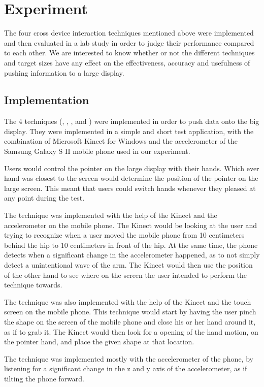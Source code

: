 \section{Experiment} \label{sec:experiment}
The four cross device interaction techniques mentioned above were implemented and then evaluated in a lab study in order to judge their performance compared to each other. 
We are interested to know whether or not the different techniques and target sizes have any effect on the effectiveness, accuracy and usefulness of pushing information to a large display. 

\subsection{Implementation}

The 4 techniques (\swipe, \tilt, \throw, and \pinch) were implemented in order to push data onto the big display. They were implemented in a simple and short test application, with the combination of Microsoft Kinect for Windows and the accelerometer of the Samsung Galaxy S II mobile phone used in our experiment. 

Users would control the pointer on the large display with their hands. 
Which ever hand was closest to the screen would determine the position of the pointer on the large screen. 
This meant that users could switch hands whenever they pleased at any point during the test. 

The \throw technique was implemented with the help of the Kinect and the accelerometer on the mobile phone. 
The Kinect would be looking at the user and trying to recognize when a user moved the mobile phone from 10 centimeters behind the hip to 10 centimeters in front of the hip. 
At the same time, the phone detects when a significant change in the accelerometer happened, as to not simply detect a unintentional wave of the arm. 
The Kinect would then use the position of the other hand to see where on the screen the user intended to perform the \throw technique towards. 

The \pinch technique was also implemented with the help of the Kinect and the touch screen on the mobile phone. 
This technique would start by having the user pinch the shape on the screen of the mobile phone and close his or her hand around it, as if to grab it. 
The Kinect would then look for a opening of the hand motion, on the pointer hand, and place the given shape at that location. 

The \tilt technique was implemented mostly with the accelerometer of the phone, by listening for a significant change in the z and y axis of the accelerometer, as if tilting the phone forward. 

